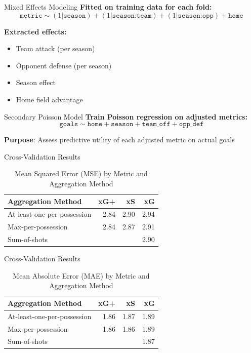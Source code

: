 \documentclass{beamer}
\begin{document}
\begin{frame}{Mixed Effects Modeling}
\textbf{Fitted on training data for each fold:}
$$\texttt{metric} \sim (1|\texttt{season}) + (1|\texttt{season:team}) + (1|\texttt{season:opp}) + \texttt{home}$$

\textbf{Extracted effects:}
\begin{itemize}
\item Team attack (per season)
\item Opponent defense (per season)
\item Season effect
\item Home field advantage
\end{itemize}
\end{frame}

\begin{frame}{Secondary Poisson Model}
\textbf{Train Poisson regression on adjusted metrics:}
$$\texttt{goals} \sim \texttt{home} + \texttt{season} + \texttt{team\_off} + \texttt{opp\_def}$$

\textbf{Purpose}: Assess predictive utility of each adjusted metric on actual goals
\end{frame}

\begin{frame}{Cross-Validation Results}
\begin{table}[!h]
\centering
\caption{Mean Squared Error (MSE) by Metric and Aggregation Method}
\begin{tabular}[t]{lrrr}
\toprule
Aggregation Method & xG+ & xS & xG\\
\midrule
At-least-one-per-possession & 2.84 & 2.90 & 2.94\\
Max-per-possession & 2.84 & 2.87 & 2.91\\
Sum-of-shots &  &  & 2.90\\
\bottomrule
\end{tabular}
\end{table}
\end{frame}

\begin{frame}{Cross-Validation Results}
\begin{table}[!h]
\centering
\caption{Mean Absolute Error (MAE) by Metric and Aggregation Method}
\begin{tabular}[t]{lrrr}
\toprule
Aggregation Method & xG+ & xS & xG\\
\midrule
At-least-one-per-possession & 1.86 & 1.87 & 1.89\\
Max-per-possession & 1.86 & 1.86 & 1.89\\
Sum-of-shots &  &  & 1.87\\
\bottomrule
\end{tabular}
\end{table}
\end{frame}
\end{document}
